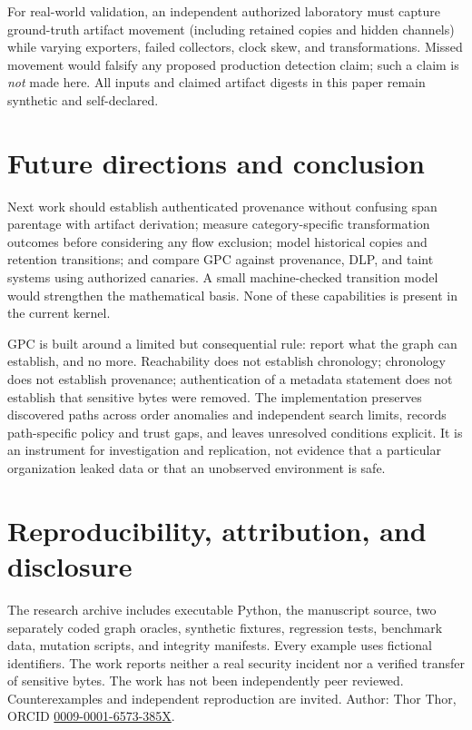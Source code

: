 \documentclass[11pt,letterpaper]{article}
\begin{document}
For real-world validation, an independent authorized laboratory must capture ground-truth artifact movement (including retained copies and hidden channels) while varying exporters, failed collectors, clock skew, and transformations. Missed movement would falsify any proposed production detection claim; such a claim is \emph{not} made here. All inputs and claimed artifact digests in this paper remain synthetic and self-declared.

\section{Future directions and conclusion}
Next work should establish authenticated provenance without confusing span parentage with artifact derivation; measure category-specific transformation outcomes before considering any flow exclusion; model historical copies and retention transitions; and compare GPC against provenance, DLP, and taint systems using authorized canaries. A small machine-checked transition model would strengthen the mathematical basis. None of these capabilities is present in the current kernel.

GPC is built around a limited but consequential rule: report what the graph can establish, and no more. Reachability does not establish chronology; chronology does not establish provenance; authentication of a metadata statement does not establish that sensitive bytes were removed. The implementation preserves discovered paths across order anomalies and independent search limits, records path-specific policy and trust gaps, and leaves unresolved conditions explicit. It is an instrument for investigation and replication, not evidence that a particular organization leaked data or that an unobserved environment is safe.

\section*{Reproducibility, attribution, and disclosure}
The research archive includes executable Python, the manuscript source, two separately coded graph oracles, synthetic fixtures, regression tests, benchmark data, mutation scripts, and integrity manifests. Every example uses fictional identifiers. The work reports neither a real security incident nor a verified transfer of sensitive bytes. The work has not been independently peer reviewed. Counterexamples and independent reproduction are invited. Author: Thor Thor, ORCID \href{https://orcid.org/0009-0001-6573-385X}{0009-0001-6573-385X}.
\end{document}
